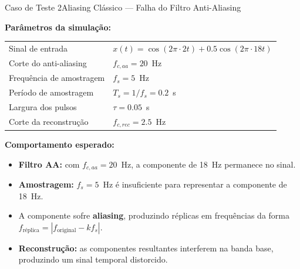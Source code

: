 \begin{frame}{Caso de Teste 2}{Aliasing Clássico — Falha do Filtro Anti-Aliasing}
	\small
	
	\textbf{Parâmetros da simulação:}
	
	\begin{center}
		\begin{tabular}{ll}
			\hline
			Sinal de entrada & $x(t)=\cos(2\pi\cdot2t)+0.5\cos(2\pi\cdot18t)$ \\
			Corte do anti-aliasing & $f_{c,aa}=20$~Hz \\
			Frequência de amostragem & $f_s=5$~Hz \\
			Período de amostragem & $T_s=1/f_s=0.2$~s \\
			Largura dos pulsos & $\tau=0.05$~s \\
			Corte da reconstrução & $f_{c,rec}=2.5$~Hz \\
			\hline
		\end{tabular}
	\end{center}
	
	\vspace{0.5em}
	
	\textbf{Comportamento esperado:}
	
	\begin{itemize}
		\item \textbf{Filtro AA:} com $f_{c,aa}=20$~Hz, a componente de 18~Hz permanece no sinal.
		\item \textbf{Amostragem:} $f_s=5$~Hz é insuficiente para representar a componente de 18~Hz.
		\item A componente sofre \textbf{aliasing}, produzindo réplicas em frequências da forma $f_{\text{réplica}}=|f_{\text{original}}-k f_s|.$
		\item \textbf{Reconstrução:} as componentes resultantes interferem na banda base, produzindo um sinal temporal distorcido.
	\end{itemize}
	
\end{frame}



